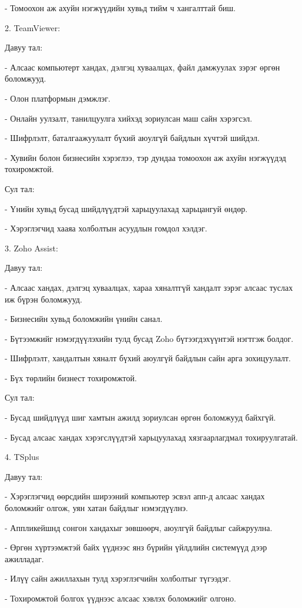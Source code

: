 	- Томоохон аж ахуйн нэгжүүдийн хувьд тийм ч хангалттай биш.

	2. TeamViewer:

	Давуу тал:
	
	- Алсаас компьютерт хандах, дэлгэц хуваалцах, файл дамжуулах зэрэг өргөн боломжууд.
	
	- Олон платформын дэмжлэг.
	
	- Онлайн уулзалт, танилцуулга хийхэд зориулсан маш сайн хэрэгсэл.
	
	- Шифрлэлт, баталгаажуулалт бүхий аюулгүй байдлын хүчтэй шийдэл.
	
	- Хувийн болон бизнесийн хэрэглээ, тэр дундаа томоохон аж ахуйн нэгжүүдэд тохиромжтой.
	
	Сул тал:

	- Үнийн хувьд бусад шийдлүүдтэй харьцуулахад харьцангуй өндөр.

	- Хэрэглэгчид хааяа холболтын асуудлын гомдол хэлдэг.

	3. Zoho Assist:

Давуу тал:

- Алсаас хандах, дэлгэц хуваалцах, хараа хяналтгүй хандалт зэрэг алсаас туслах иж бүрэн боломжууд.

- Бизнесийн хувьд боломжийн үнийн санал.

- Бүтээмжийг нэмэгдүүлэхийн тулд бусад Zoho бүтээгдэхүүнтэй нэгтгэж болдог.

- Шифрлэлт, хандалтын хяналт бүхий аюулгүй байдлын сайн арга зохицуулалт.

- Бүх төрлийн бизнест тохиромжтой.

Сул тал:

- Бусад шийдлүүд шиг хамтын ажилд зориулсан өргөн боломжууд байхгүй.

- Бусад алсаас хандах хэрэгслүүдтэй харьцуулахад хязгаарлагдмал тохируулгатай.

4. TSplus 

Давуу тал:

- Хэрэглэгчид өөрсдийн ширээний компьютер эсвэл апп-д алсаас хандах боломжийг олгож, уян хатан байдлыг нэмэгдүүлнэ.

- Аппликейшнд сонгон хандахыг зөвшөөрч, аюулгүй байдлыг сайжруулна.

- Өргөн хүртээмжтэй байх үүднээс янз бүрийн үйлдлийн системүүд дээр ажилладаг.

-  Илүү сайн ажиллахын тулд хэрэглэгчийн холболтыг түгээдэг.

- Тохиромжтой болгох үүднээс алсаас хэвлэх боломжийг олгоно.

